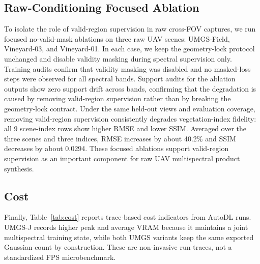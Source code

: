 

\subsection{Raw-Conditioning Focused Ablation}

To isolate the role of valid-region supervision in raw cross-FOV captures, we run focused no-valid-mask ablations on three raw UAV scenes: UMGS-Field, Vineyard-03, and Vineyard-01. In each case, we keep the geometry-lock protocol unchanged and disable validity masking during spectral supervision only. Training audits confirm that validity masking was disabled and no masked-loss steps were observed for all spectral bands. Support audits for the ablation outputs show zero support drift across bands, confirming that the degradation is caused by removing valid-region supervision rather than by breaking the geometry-lock contract. Under the same held-out views and evaluation coverage, removing valid-region supervision consistently degrades vegetation-index fidelity: all 9 scene-index rows show higher RMSE and lower SSIM. Averaged over the three scenes and three indices, RMSE increases by about 40.2\% and SSIM decreases by about 0.0294. These focused ablations support valid-region supervision as an important component for raw UAV multispectral product synthesis.



\subsection{Cost}

Finally, Table~\ref{tab:cost} reports trace-based cost indicators from AutoDL runs. UMGS-J records higher peak and average VRAM because it maintains a joint multispectral training state, while both UMGS variants keep the same exported Gaussian count by construction. These are non-invasive run traces, not a standardized FPS microbenchmark.




